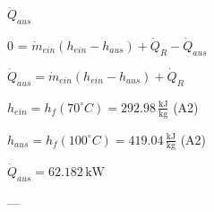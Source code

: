 \( \dot{Q}_{aus} \)  

0 = \( \dot{m}_{ein} (h_{ein} - h_{aus}) + \dot{Q}_R - \dot{Q}_{aus} \)  

\( \dot{Q}_{aus} = \dot{m}_{ein} (h_{ein} - h_{aus}) + \dot{Q}_R \)  

\( h_{ein} = h_f(70^\circ C) = 292.98 \, \frac{\text{kJ}}{\text{kg}} \) (A2)  

\( h_{aus} = h_f(100^\circ C) = 419.04 \, \frac{\text{kJ}}{\text{kg}} \) (A2)  

\( \dot{Q}_{aus} = 62.182 \, \text{kW} \)  

---